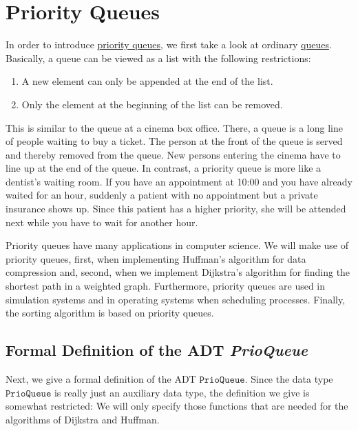 \chapter{Priority Queues \label{chap:prioqueue}}
In order to introduce \href{https://en.wikipedia.org/wiki/Priority_queue}{priority queues},
we first take a look at ordinary
\href{https://en.wikipedia.org/wiki/Queue_(abstract_data_type)}{queues}.
Basically, a queue can be viewed as a list with the following restrictions:
\begin{enumerate}
\item A new element can only be appended at the end of the list.
\item Only the element at the beginning of the list can be removed.
\end{enumerate}
This is similar to the queue at a cinema box office.  There, a queue is a long line of people
waiting to buy a ticket.  The person at the front of the queue is served and thereby removed from
the queue.  New persons entering the cinema have to line up at the end of the queue.  In contrast, a
priority queue is more like a dentist's waiting room.  If you have an appointment at 10:00 and you
have already waited for an hour, suddenly a patient with no appointment but a private insurance
shows up.  Since this patient has a higher priority, she will be attended next while you have
to wait for another hour. 

Priority queues have many applications in computer science.  We will make use of priority queues,
first, when implementing Huffman's algorithm for data compression and, second, when we implement
Dijkstra's algorithm for finding the shortest path in a weighted graph.  Furthermore, priority
queues are used in simulation systems and in operating systems when scheduling processes.
Finally, the sorting algorithm  is based on priority queues.

\section[Formal Definition]{Formal Definition of the ADT \textsl{PrioQueue}}
Next, we give a formal definition of the ADT $\mathtt{PrioQueue}$.  Since the data type
$\mathtt{PrioQueue}$ is really just an auxiliary data type, the definition we give is somewhat
restricted: We will only specify those functions that are needed for the algorithms of Dijkstra
and Huffman.

